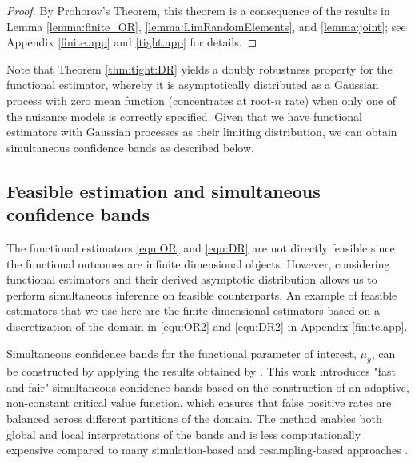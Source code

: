 \documentclass[12pt, A4]{article}
\begin{document}
            \begin{proof}
                By Prohorov's Theorem, this theorem is a consequence of the results in Lemma \ref{lemma:finite_OR}, \ref{lemma:LimRandomElements}, and \ref{lemma:joint}; see Appendix \ref{finite.app} and \ref{tight.app} for details.
            \end{proof}
    
        Note that Theorem \ref{thm:tight:DR} yields a doubly robustness property for the functional estimator, whereby it is asymptotically distributed as a Gaussian process with zero mean function (concentrates at root-$n$ rate) when only one of the nuisance models is correctly specified. 
        Given that we have functional estimators with Gaussian processes as their limiting distribution, we can obtain simultaneous confidence bands as described below.
        \subsection{Feasible estimation and simultaneous confidence bands}\label{sec:feasible}
        The functional estimators \eqref{equ:OR} and \eqref{equ:DR} are not directly feasible since the functional outcomes are infinite dimensional objects. 
        However, considering functional estimators and their derived asymptotic distribution allows us to perform simultaneous inference on feasible counterparts. 
        An example of feasible estimators that we use here are the finite-dimensional estimators based on a discretization of the domain in \eqref{equ:OR2} and \eqref{equ:DR2} in Appendix \ref{finite.app}. 

        Simultaneous confidence bands for the functional parameter of interest, $\mu_y$, can be constructed by applying the results obtained by \cite{Liebl}. 
        This work introduces "fast and fair" simultaneous confidence bands based on the construction of an adaptive, non-constant critical value function, which ensures that false positive rates are balanced across different partitions of the domain. 
        The method enables both global and local interpretations of the bands and is less computationally expensive compared to many simulation-based and resampling-based approaches \cite[e.g.,][]{Pini17, Abram}. 
\end{document}
